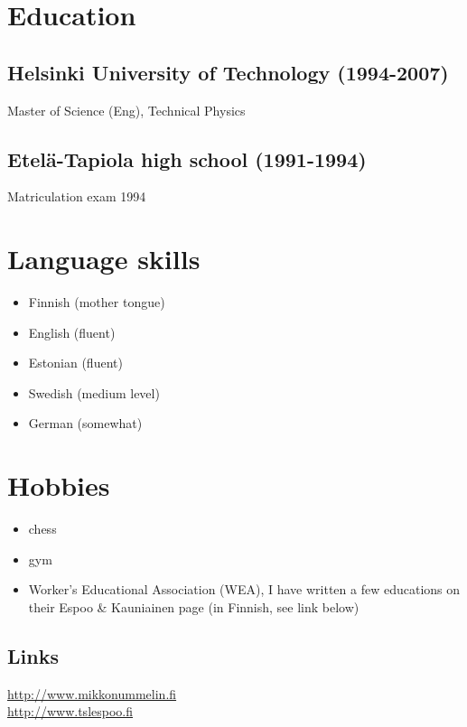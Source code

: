 \documentclass[a4paper,12pt]{article}
\begin{document}
\section*{Education}
\subsection*{Helsinki University of Technology (1994-2007)}
Master of Science (Eng), Technical Physics
\subsection*{Etelä-Tapiola high school (1991-1994)}
Matriculation exam 1994
\section*{Language skills}
\begin{itemize}
\item{Finnish (mother tongue)}
\item{English (fluent)}
\item{Estonian (fluent)}
\item{Swedish (medium level)}
\item{German (somewhat)}
\end{itemize}
\section*{Hobbies}
\begin{itemize}
\item{chess}
\item{gym}
\item{Worker's Educational Association (WEA), I have written a few educations on their Espoo \& Kauniainen page (in Finnish, see link below)}
\end{itemize}
\subsection*{Links}
\href{http://www.mikkonummelin.fi}{http://www.mikkonummelin.fi} \\
\href{http://www.tslespoo.fi}{http://www.tslespoo.fi}
\end{document}
